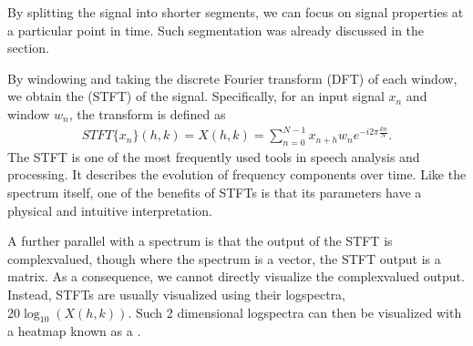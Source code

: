 \documentclass[letterpaper,10pt,english]{jupyterBook}
\begin{document}
\sphinxAtStartPar
By splitting the signal into shorter segments, we can focus on signal
properties at a particular point in time. Such segmentation was already
discussed in the  section.

\sphinxAtStartPar
By windowing and taking the discrete Fourier transform (DFT) of each
window, we obtain the 
(STFT) of the signal. Specifically, for an input signal
\(x_{n}\) and window \(w_{n}\), the transform is defined as
\begin{equation*}
\begin{split} STFT\{x_n\}(h,k) = X(h,k) = \sum_{n=0}^{N-1} x_{n+h} w_n
e^{-i2\pi\frac{kn}N}. \end{split}
\end{equation*}
\sphinxAtStartPar
The STFT is one of the most frequently used tools in speech analysis and
processing. It describes the evolution of frequency components over
time. Like the spectrum itself, one of the benefits of STFTs is that its
parameters have a physical and intuitive interpretation.

\sphinxAtStartPar
A further parallel with a spectrum is that the output of the STFT is
complex\sphinxhyphen{}valued, though where the spectrum is a vector, the STFT output
is a matrix. As a consequence, we cannot directly visualize the
complex\sphinxhyphen{}valued output. Instead, STFTs are usually visualized using their
log\sphinxhyphen{}spectra,  \( 20\log_{10}(X(h,k)). \) Such 2 dimensional
log\sphinxhyphen{}spectra can then be visualized with a heat\sphinxhyphen{}map known as
a .
\end{document}
